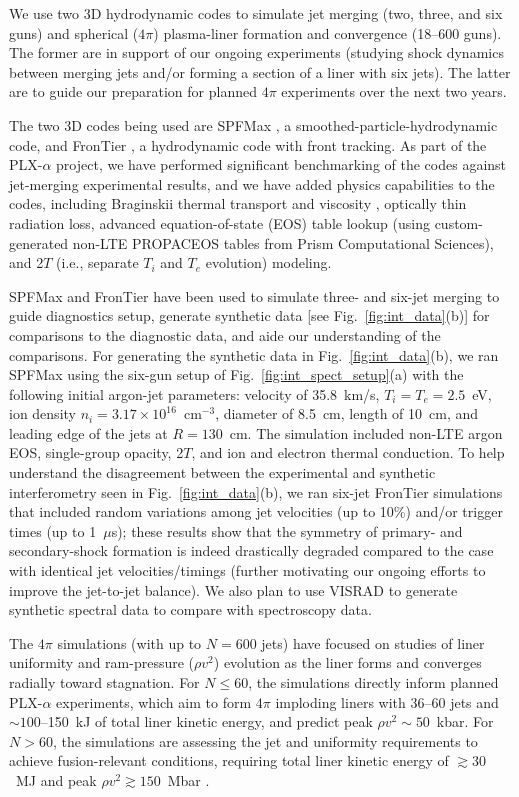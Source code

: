 \documentclass[journal]{IEEEtran}
\begin{document}
We use two 3D hydrodynamic codes to simulate jet merging (two, three, and six guns)
and spherical ($4\pi$) plasma-liner formation and convergence (18--600 guns).  The former are
in support of our ongoing experiments (studying shock dynamics between
merging jets and/or forming a section of a liner with six jets).  The latter are to guide our
preparation for planned $4\pi$ experiments over the next two years.

The two 3D codes being used are SPFMax \cite{cassibry17}, 
a smoothed-particle-hydrodynamic code, and 
FronTier \cite{samulyak07},
a hydrodynamic code with front tracking.  As part of the PLX-$\alpha$ project,
we have performed significant benchmarking of the codes against jet-merging experimental
results, and we have added physics capabilities to the codes, including Braginskii thermal
transport and viscosity \cite{braginskii65}, optically thin radiation loss, advanced equation-of-state 
(EOS) table lookup
(using custom-generated non-LTE
PROPACEOS tables \cite{macfarlane06} from Prism Computational Sciences),
and 2$T$ (i.e., separate $T_i$ and $T_e$ evolution) modeling.

SPFMax and FronTier have been used to simulate
three- and six-jet merging to guide diagnostics setup, generate synthetic data
[see Fig.~\ref{fig:int_data}(b)] for
comparisons to the diagnostic data, and aide our understanding of the comparisons.
For generating the
synthetic data in Fig.~\ref{fig:int_data}(b), we ran SPFMax using the six-gun
setup of Fig.~\ref{fig:int_spect_setup}(a) with the following initial argon-jet parameters:  
velocity of 35.8~km/s, $T_i=T_e = 2.5$~eV, ion density
$n_i = 3.17\times10^{16}$~cm$^{-3}$, diameter of 8.5~cm, length of 10~cm, and leading
edge of the jets at $R=130$~cm.  The simulation included non-LTE argon EOS, single-group
opacity, 2$T$, and ion and electron thermal conduction.  To help understand
the disagreement between the experimental and synthetic interferometry
seen in Fig.~\ref{fig:int_data}(b), we ran six-jet FronTier simulations that included
random variations among jet velocities (up to 10\%) and/or trigger times
(up to 1~$\mu$s); these results show that the symmetry of primary- and secondary-shock formation
is indeed drastically degraded compared to the case with identical jet velocities/timings
(further motivating our ongoing efforts to improve the jet-to-jet balance).
We also plan to use VISRAD \cite{macfarlane03jqsrt}
to generate synthetic spectral data to compare with spectroscopy data.

The $4\pi$ simulations (with up to $N=600$ jets)
have focused on studies of liner uniformity and ram-pressure ($\rho v^2$) evolution
as the liner forms and converges radially toward stagnation.  For $N\le 60$, the simulations
directly inform planned PLX-$\alpha$ experiments, which aim to form $4\pi$ imploding liners
with 36--60 jets and $\sim 100$--150~kJ of total liner kinetic energy, and predict peak $\rho v^2 \sim 50$~kbar. 
For $N>60$, the simulations are assessing the jet and uniformity requirements 
to achieve fusion-relevant conditions, requiring
total liner kinetic energy of $\gtrsim 30$~MJ and peak $\rho v^2\gtrsim 150$~Mbar 
\cite{knapp14,langendorf17pop}.
\end{document}
